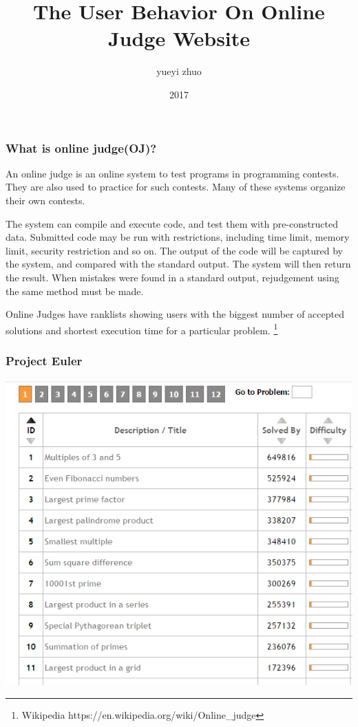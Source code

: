 \documentclass{beamer}
\title[OJ user behavior]{The User Behavior On Online Judge Website }
\author[yiyuezhuo]{yueyi zhuo}
\institute[SICNU]{School of Mathematical,Sichuan Normal University}
\date{2017}
\begin{document}
\frame{\titlepage}

\begin{frame}

\frametitle{What is online judge(OJ)?}

An online judge is an online system to test programs in programming contests. 
They are also used to practice for such contests. Many of these systems organize their own contests.

The system can compile and execute code, and test them with pre-constructed data. 
Submitted code may be run with restrictions, including time limit, memory limit, security restriction and so on. 
The output of the code will be captured by the system, and compared with the standard output. 
The system will then return the result. When mistakes were found in a standard output, 
rejudgement using the same method must be made.

Online Judges have ranklists showing users with the biggest number of accepted solutions and shortest 
execution time for a particular problem. \footnote{Wikipedia https://en.wikipedia.org/wiki/Online\_judge}

\end{frame}

\begin{frame}
\frametitle{Project Euler}
\includegraphics[scale=0.55]{euler-oj.png}
\end{frame}
\end{document}
